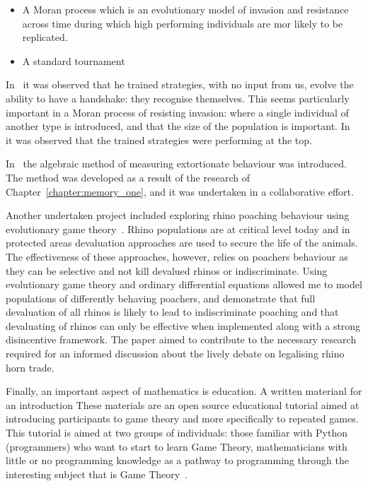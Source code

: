 \begin{itemize}
    \item A Moran process which is an evolutionary model of invasion and
    resistance across time during which high performing individuals are mor
    likely to be replicated.
    \item A standard tournament
\end{itemize}

In~\cite{Harper2017} it was observed that he trained strategies, with no input
from us, evolve the ability to have a handshake: they recognise themselves. This
seems particularly important in a Moran process of resisting invasion: where a
single individual of another type is introduced, and that the size of the
population is important. In~\cite{Knight2017} it was observed that the trained
strategies were performing at the top.

In~\cite{Knight2019} the algebraic method of measuring extortionate behaviour
was introduced. The method was developed as a result of the research of
Chapter~\ref{chapter:memory_one}, and it was undertaken in a collaborative
effort.

Another undertaken project included exploring rhino poaching behaviour using
evolutionary game theory~\cite{Glynatsi2018}. Rhino populations are at critical
level today and in protected areas devaluation approaches are used to secure the
life of the animals. The effectiveness of these approaches, however, relies on
poachers behaviour as they can be selective and not kill devalued rhinos or
indiscriminate. Using evolutionary game theory and ordinary differential
equations allowed me to model populations of differently behaving poachers, and
demonstrate that full devaluation of all rhinos is likely to lead to
indiscriminate poaching and that devaluating of rhinos can only be effective
when implemented along with a strong disincentive framework. The paper aimed to
contribute to the necessary research required for an informed discussion about
the lively debate on legalising rhino horn trade.

Finally, an important aspect of mathematics is education. A written materianl
for an introduction These materials are an open source educational tutorial
aimed at introducing participants to game theory and more specifically to
repeated games. This tutorial is aimed at two groups of individuals: those
familiar with Python (programmers) who want to start to learn Game Theory,
mathematicians with little or no programming knowledge as a pathway to
programming through the interesting subject that is Game Theory~\cite{Glynatsi2017_game}.

